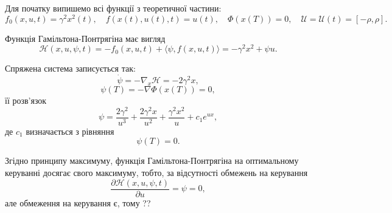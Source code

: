 \begin{solution}
    Для початку випишемо всі функції з теоретичної частини:
    \begin{equation}
        f_0(x, u, t) = \gamma^2 x^2(t), \quad f(x(t), u(t), t) = u(t), \quad \Phi(x(T)) = 0, \quad \mathcal{U} = \mathcal{U}(t) = [-\rho, \rho].
    \end{equation}
    
    Функція Гамільтона-Понтрягіна має вигляд
    \begin{equation}
        \mathcal{H} (x, u, \psi, t) = - f_0(x, u, t) + \langle \psi, f(x, u, t) \rangle = - \gamma^2 x^2 + \psi u.
    \end{equation}
    
    Спряжена система записується так:
    \begin{equation} 
        \dot \psi = - \nabla_x \mathcal{H} = - 2 \gamma^2 x,
    \end{equation}
    \begin{equation} 
        \psi(T) = - \nabla \Phi(x(T)) = 0,
    \end{equation}
    її розв'язок 
    \begin{equation}
        \psi = \dfrac{2 \gamma^2}{u^3} + \dfrac{2 \gamma^2 x}{u^2} + \dfrac{\gamma^2 x^2}{u} + c_1 e^{u x},
    \end{equation}
    де $c_1$ визначається з рівняння
    \begin{equation}
        \psi(T) = 0.
    \end{equation}
    
    Згідно принципу максимуму, функція Гамільтона-Понтрягіна на оптимальному керуванні досягає свого максимуму, тобто, за відсутності обмежень на керування
    \begin{equation} 
        \dfrac{\partial \mathcal{H}(x, u, \psi, t)}{\partial u} = \psi = 0,
    \end{equation}
    але обмеження на керування є, тому ??
    
\end{solution}






